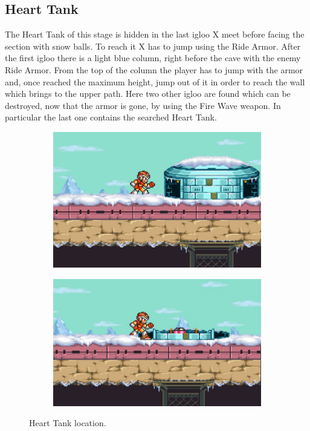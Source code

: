\subsection{Heart Tank}\label{Penguin:heart_tank}
The Heart Tank of this stage is hidden in the last igloo X meet before facing the section with snow balls. To reach it X has to jump using the Ride Armor. After the first igloo there is a light blue column, right before the cave with the enemy Ride Armor. From the top of the column the player has to jump with the armor and, once reached the maximum height, jump out of it in order to reach the wall which brings to the upper path. Here two other igloo are found which can be destroyed, now that the armor is gone, by using the Fire Wave weapon. In particular the last one contains the searched Heart Tank.
\begin{figure}[htp]
	\centering
	\begin{subfigure}{0.375\linewidth}
		\centering
		\includegraphics[width=\textwidth]{figures/X1/Chill_penguin/Chill_heart_1.jpg}	
		\caption{}
	\end{subfigure}
	\begin{subfigure}{0.4\linewidth}
		\centering
		\includegraphics[width=\textwidth]{figures/X1/Chill_penguin/Chill_heart_2.jpg}	
		\caption{}
	\end{subfigure}
	\caption{Heart Tank location.}
\end{figure}

